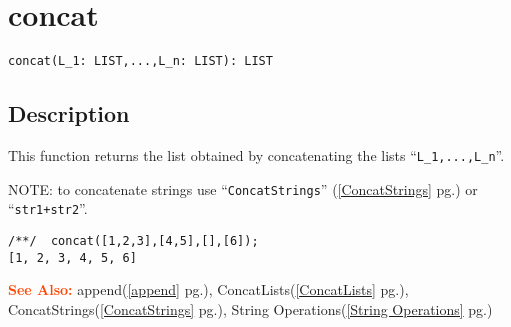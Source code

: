 \documentclass[a4paper]{mybook}
\newenvironment{command}{}{} %
\newcommand\SeeAlso{\par\textcolor{OrangeRed}{\textbf{\large See Also: }}}
\begin{document}
\section{concat}
\label{concat}
\begin{command} %


\begin{Verbatim}[label=syntax, rulecolor=\color{MidnightBlue},
frame=single]
concat(L_1: LIST,...,L_n: LIST): LIST
\end{Verbatim}


\subsection*{Description}

This function returns the list obtained by concatenating the lists
``\verb&L_1,...,L_n&''.
\par 
NOTE: to concatenate strings use ``\verb&ConcatStrings&'' (\ref{ConcatStrings} pg.\pageref{ConcatStrings}) or ``\verb&str1+str2&''.
\begin{Verbatim}[label=example, rulecolor=\color{PineGreen}, frame=single]
/**/  concat([1,2,3],[4,5],[],[6]);
[1, 2, 3, 4, 5, 6]
\end{Verbatim}


\SeeAlso %
  append(\ref{append} pg.\pageref{append}), 
    ConcatLists(\ref{ConcatLists} pg.\pageref{ConcatLists}), 
    ConcatStrings(\ref{ConcatStrings} pg.\pageref{ConcatStrings}), 
    String Operations(\ref{String Operations} pg.\pageref{String Operations})
\end{command} %
\end{document}
